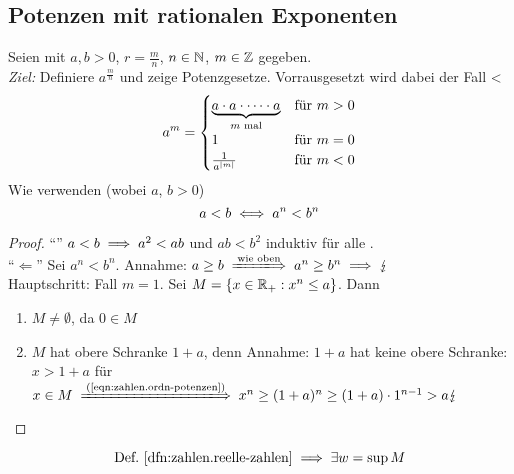 \documentclass[12pt]{scrreprt}
\begin{document}
\subsection*{Potenzen mit rationalen Exponenten}
Seien  mit $a, b > 0$, $r=\frac{m}{n}$, $n\in\mathbb{N}$, $m\in\mathbb{Z}$ gegeben.\\
\emph{Ziel:} Definiere $a^\frac{m}{n}$ und zeige Potenzgesetze. Vorrausgesetzt wird dabei der Fall
<\[a^m =
\begin{cases}
\underbrace{a \cdot a \cdot \dotsm \cdot a}_{m\text{ mal}} &\text{für }m>0\\
1 &\text{für }m=0\\
\frac{1}{a^{\left\lvert m\right\lvert}} &\text{für }m<0
\end{cases}\]
Wie verwenden (wobei $a$, $b > 0$)
\begin{equation} 
a<b \iff a^n <  b^n 
\label{eqn:zahlen.ordn-potenzen}
\end{equation}
\begin{proof}
"`\folgt"' $a<b \implies a^2 < ab$ und $ab < b^2$ induktiv für alle .\\
"`$\Longleftarrow$"' Sei $a^n < b^n$. Annahme: $a \ge b \folgtwegen{\text{wie oben}} a^n \ge b^n \folgt \blitz$\\
Hauptschritt: Fall $m=1$. Sei $M = \{ x \in \mathbb{R}_+ : x^n \le a \}$. Dann
\begin{enumerate}
\item $M \ne \emptyset$, da $0 \in M$
\item $M$ hat obere Schranke $1+a$, denn Annahme: $1+a$ hat keine 
obere Schranke: $x>1+a$ für $x \in M \folgtnach{(\ref{eqn:zahlen.ordn-potenzen})} 
x^n \ge (1+a)^n\ge (1+a)\cdot 1^{n-1} > a \blitz$
\end{enumerate}
\end{proof}

\begin{equation}
\text{Def.~\ref{dfn:zahlen.reelle-zahlen}} \implies \exists w = \sup M
\label{eqn:zahlen.exist-wurzel}
\end{equation}
\end{document}

